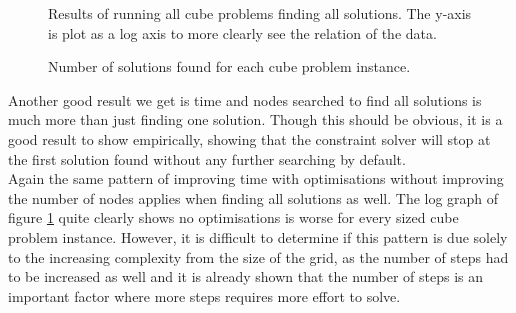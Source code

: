 \documentclass{article}
\newcommand{\n}[0]{\\[\baselineskip]}
\begin{document}
\begin{figure}[H]
\begin{minipage}{0.45\textwidth}
\end{minipage}
\caption{Results of running all cube problems finding all solutions. The y-axis is plot as a log axis to more clearly see the relation of the data.}
\label{fig:cube-all}
\end{figure}

\begin{figure}[H]
\centering
{}
\caption{Number of solutions found for each cube problem instance.}
\end{figure}
\noindent
Another good result we get is time and nodes searched to find all solutions is much more than just finding one solution. Though this should be obvious, it is a good result to show empirically, showing that the constraint solver will stop at the first solution found without any further searching by default.
\n
Again the same pattern of improving time with optimisations without improving the number of nodes applies when finding all solutions as well. The log graph of figure \ref{fig:cube-all} quite clearly shows no optimisations is worse for every sized cube problem instance. However, it is difficult to determine if this pattern is due solely to the increasing complexity from the size of the grid, as the number of steps had to be increased as well and it is already shown that the number of steps is an important factor where more steps requires more effort to solve.
\end{document}
